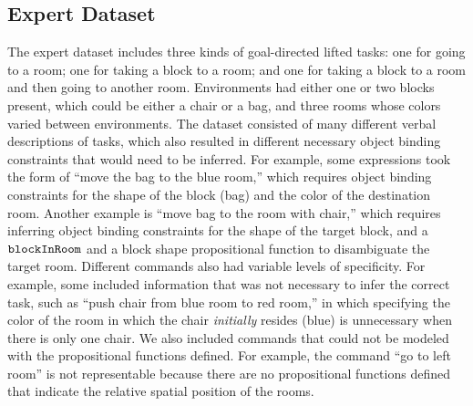 \documentclass[conference]{IEEEtran}
\begin{document}


\subsection{Expert Dataset}
The expert dataset includes three kinds of goal-directed lifted tasks: one for going to a room; one for taking a block to a room; and one for taking a block to a room and then going to another room. Environments had either one or two blocks present, which could be either a chair or a bag, and three rooms whose colors varied between environments. The dataset consisted of many different verbal descriptions of tasks, which also resulted in different necessary object binding constraints that would need to be inferred. For example, some expressions took the form of ``move the bag to the blue room,'' which requires object binding constraints for the shape of the block (bag) and the color of the destination room. Another example is ``move bag to the room with chair,'' which requires inferring object binding constraints for the shape of the target block, and a ${\tt blockInRoom}$ and a block shape propositional function to disambiguate the target room. Different commands also had variable levels of specificity. For example, some included information that was not necessary to infer the correct task, such as ``push chair from blue room to red room,'' in which specifying the color of the room in which the chair {\em initially} resides (blue) is unnecessary when there is only one chair. We also included commands that could not be modeled with the propositional functions defined. For example, the command ``go to left room'' is not representable because there are no propositional functions defined that indicate the relative spatial position of the rooms.%
\end{document}
